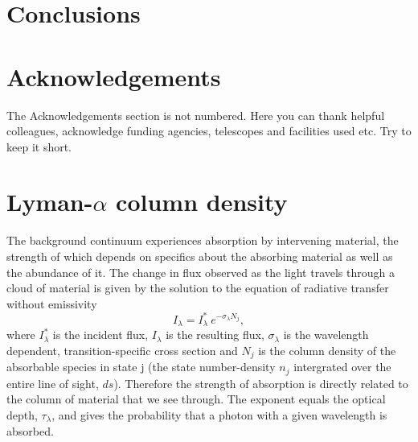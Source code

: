 \documentclass[a4paper,fleqn,usenatbib]{mnras}
\begin{document}
\section{Conclusions}



\section*{Acknowledgements}

The Acknowledgements section is not numbered. Here you can thank helpful
colleagues, acknowledge funding agencies, telescopes and facilities used etc.
Try to keep it short.










\appendix

\section{Lyman-$\alpha$ column density}

The background continuum experiences absorption by intervening material, the
strength of which depends on specifics about the absorbing material as well as
the abundance of it. The change in flux observed as the light travels through a
cloud of material is given by the solution to the equation of radiative transfer without emissivity
\begin{equation}
I_\lambda = I_\lambda^* \  e^{ - \sigma_{\lambda} N_j}, 
\end{equation} 
where $I_\lambda^*$ is the incident flux, $I_\lambda$ is the resulting flux,
$\sigma_{\lambda}$ is the wavelength dependent, transition-specific cross
section and $N_j$ is the column density of the absorbable species in state j 
(the state number-density $n_j$ intergrated over the entire line of sight,
$ds$). Therefore the strength of absorption is directly related to the column of
material that we see through. The exponent equals the optical depth,
$\tau_\lambda$, and gives the probability that a photon with a given wavelength
is absorbed. 
\end{document}
